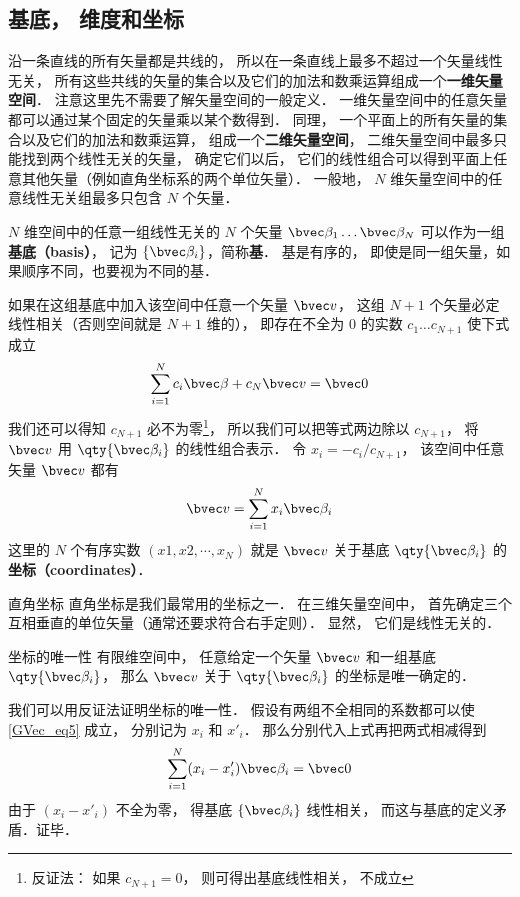 \subsection{基底， 维度和坐标}
沿一条直线的所有矢量都是共线的， 所以在一条直线上最多不超过一个矢量线性无关， 所有这些共线的矢量的集合以及它们的加法和数乘运算组成一个\textbf{一维矢量空间}． 注意这里先不需要了解矢量空间的一般定义． 一维矢量空间中的任意矢量都可以通过某个固定的矢量乘以某个数得到． 同理， 一个平面上的所有矢量的集合以及它们的加法和数乘运算， 组成一个\textbf{二维矢量空间}， 二维矢量空间中最多只能找到两个线性无关的矢量， 确定它们以后， 它们的线性组合可以得到平面上任意其他矢量（例如直角坐标系的两个单位矢量）． 一般地， $N$ 维矢量空间中的任意线性无关组最多只包含 $N$ 个矢量．

$N$ 维空间中的任意一组线性无关的 $N$ 个矢量 $\bvec \beta_1\dots \bvec \beta_N$ 可以作为一组\textbf{基底（basis）}， 记为 $\{\bvec \beta_i\}$，简称\textbf{基}． 基是有序的， 即使是同一组矢量，如果顺序不同，也要视为不同的基．

如果在这组基底中加入该空间中任意一个矢量 $\bvec v$， 这组 $N+1$ 个矢量必定线性相关（否则空间就是 $N+1$ 维的）， 即存在不全为 0 的实数 $c_1\dots c_{N+1}$ 使下式成立
\begin{equation}
\sum_{i=1}^{N} c_i \bvec \beta + c_N \bvec v = \bvec 0
\end{equation}
我们还可以得知 $c_{N+1}$ 必不为零\footnote{反证法： 如果 $c_{N+1} = 0$， 则可得出基底线性相关， 不成立}， 所以我们可以把等式两边除以 $c_{N+1}$， 将 $\bvec v$ 用 $\qty{\bvec \beta_i}$ 的线性组合表示． 令 $x_i = -c_i/c_{N+1}$， 该空间中任意矢量 $\bvec v$ 都有
\begin{equation}\label{GVec_eq5}
\bvec v = \sum_{i=1}^N x_i \bvec \beta_i
\end{equation}
这里的 $N$ 个有序实数 $(x1, x2, \cdots, x_N)$ 就是 $\bvec v$ 关于基底 $\qty{\bvec \beta_i}$ 的\textbf{坐标（coordinates）}．

\begin{example}{直角坐标}
直角坐标是我们最常用的坐标之一． 在三维矢量空间中， 首先确定三个互相垂直的单位矢量（通常还要求符合右手定则）． 显然， 它们是线性无关的．
\end{example}

\begin{theorem}{坐标的唯一性}
有限维空间中， 任意给定一个矢量 $\bvec v$ 和一组基底 $\qty{\bvec \beta_i}$， 那么 $\bvec v$ 关于 $\qty{\bvec \beta_i}$ 的坐标是唯一确定的．
\end{theorem}
我们可以用反证法证明坐标的唯一性． 假设有两组不全相同的系数都可以使\autoref{GVec_eq5} 成立， 分别记为 $x_i$ 和 $x'_i$． 那么分别代入上式再把两式相减得到
\begin{equation}
\sum_{i=1}^N (x_i-x'_i) \bvec \beta_i = \bvec 0
\end{equation}
由于 $(x_i-x'_i)$ 不全为零， 得基底 $\{\bvec \beta_i\}$ 线性相关， 而这与基底的定义矛盾．证毕．

